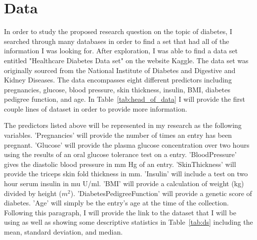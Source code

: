 \documentclass[12pt]{article}
\begin{document}
\section{Data}
\label{sec:data}
    In order to study the proposed research question on the topic of diabetes, I searched through many databases in order to find a set 
    that had all of the information I was looking for. After exploration, I was able to find a data set entitled "Healthcare Diabetes Data set" on 
    the website Kaggle. The data set was originally sourced from the National Institute of Diabetes and Digestive and Kidney Diseases. The 
    data encompasses eight different predictors including pregnancies, glucose, blood pressure, skin thickness, insulin, BMI, diabetes 
    pedigree function, and age. In Table~\ref{tab:head_of_data} I will provide the first couple lines of dataset in order to provide
    more information. 

    \begin{table}[ht]
    \caption{Head of the Dataset}
    \centering
    \label{tab:head_of_data}
    \end{table}
    
    The predictors listed above will be represented in my research as the following variables. 'Pregnancies' will provide the number of 
    times an entry has been pregnant. 'Glucose' will provide the plasma glucose concentration over two hours using the results of an oral 
    glucose tolerance test on a entry. 'BloodPressure' gives the diastolic blood pressure in mm Hg of an entry. 'SkinThickness' will 
    provide the triceps skin fold thickness in mm. 'Insulin' will include a test on two hour serum insulin in mu U/ml. 'BMI' will provide a 
    calculation of weight (kg) divided by height ($m^2$). 'DiabetesPedigreeFunction' will provide a genetic score of diabetes. 'Age' will 
    simply be the entry's age at the time of the collection. Following this paragraph, I will provide the link to the dataset that I will 
    be using as well as showing some descriptive statistics in Table~\ref{tab:ds} including the mean, standard deviation, and median.  
\end{document}
